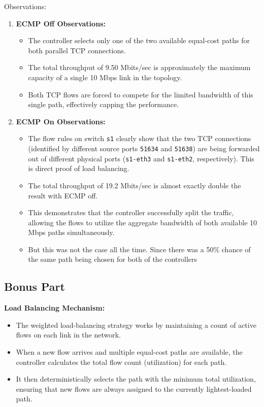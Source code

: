 \documentclass[12pt]{article}
\begin{document}
Observations:
\begin{enumerate}
    \item \textbf{ECMP Off Observations:}
    \begin{itemize}
        \item The controller selects only one of the two available equal-cost paths for both parallel TCP connections.
        \item The total throughput of 9.50 Mbits/sec is approximately the maximum capacity of a single 10 Mbps link in the topology.
        \item Both TCP flows are forced to compete for the limited bandwidth of this single path, effectively capping the performance.
    \end{itemize}
    \item \textbf{ECMP On Observations:}
    \begin{itemize}
        \item The flow rules on switch \texttt{s1} clearly show that the two TCP connections (identified by different source ports \texttt{51634} and \texttt{51638}) are being forwarded out of different physical ports (\texttt{s1-eth3} and \texttt{s1-eth2}, respectively). This is direct proof of load balancing.
        \item The total throughput of 19.2 Mbits/sec is almost exactly double the result with ECMP off.
        \item This demonstrates that the controller successfully split the traffic, allowing the flows to utilize the aggregate bandwidth of both available 10 Mbps paths simultaneously.
        \item But this was not the case all the time. Since there was a 50\% chance of the same path being chosen for both of the controllers
    \end{itemize}
\end{enumerate}

\subsection{Bonus Part}

\noindent \textbf{Load Balancing Mechanism:}
\begin{itemize}
    \item The weighted load-balancing strategy works by maintaining a count of active flows on each link in the network. 
    \item When a new flow arrives and multiple equal-cost paths are available, the controller calculates the total flow count (utilization) for each path. 
    \item It then deterministically selects the path with the minimum total utilization, ensuring that new flows are always assigned to the currently lightest-loaded path.
\end{itemize}
\end{document}
